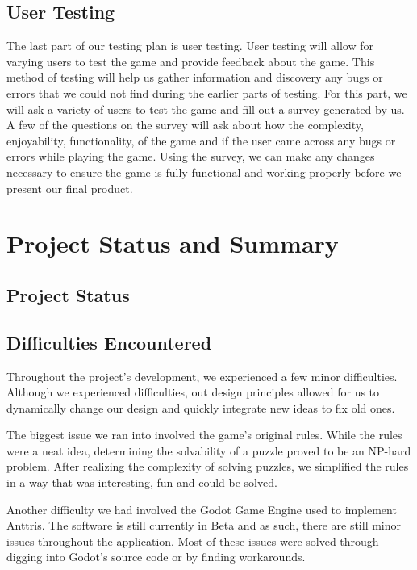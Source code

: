 \documentclass[12pt]{article}
\begin{document}
\subsection{User Testing}
The last part of our testing plan is user testing. User testing will allow for varying users to test the game and provide feedback about the game. This method of testing will help us gather information and discovery any bugs or errors that we could not find during the earlier parts of testing. For this part, we will ask a variety of users to test the game and fill out a survey generated by us. A few of the questions on the survey will ask about how the complexity, enjoyability, functionality, of the game and if the user came across any bugs or errors while playing the game. Using the survey, we can make any changes necessary to ensure the game is fully functional and working properly before we present our final product.

\section{Project Status and Summary}
\subsection{Project Status} %
\subsection{Difficulties Encountered} %
Throughout the project's development, we experienced a few minor difficulties. Although we experienced difficulties, out design principles allowed for us to dynamically change our design and quickly integrate new ideas to fix old ones.

The biggest issue we ran into involved the game's original rules. While the rules were a neat idea, determining the solvability of a puzzle proved to be an NP-hard problem. After realizing the complexity of solving puzzles, we simplified the rules in a way that was interesting, fun and could be solved.

Another difficulty we had involved the Godot Game Engine used to implement Anttris. The software is still currently in Beta and as such, there are still minor issues throughout the application. Most of these issues were solved through digging into Godot's source code or by finding workarounds.
\end{document}
